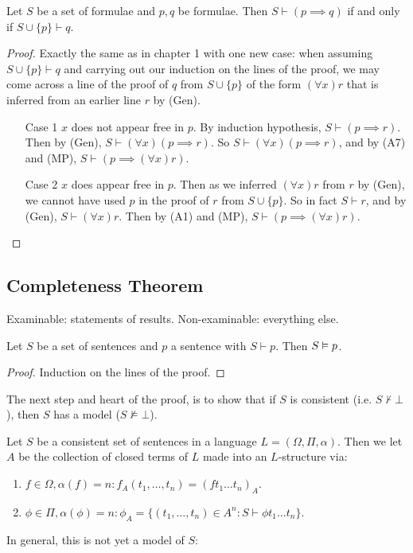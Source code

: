 \documentclass[10pt,a4paper]{article}
\begin{document}
\begin{proposition}
Let $S$ be a set of formulae and $p,q$ be formulae. Then $S \vdash (p \implies q)$ if and only if $S \cup \{p\} \vdash q$.
\end{proposition}
\begin{proof}
Exactly the same as in chapter 1 with one new case: when assuming $S \cup \{p\}\vdash q$ and carrying out our induction on the lines of the proof, we may come across a line of the proof of $q$ from $S \cup \{p\}$ of the form $(\forall x)r$ that is inferred from an earlier line $r$ by (Gen).
\begin{itemize}
\item[Case 1] $x$ does not appear free in $p$. By induction hypothesis, $S \vdash (p \implies r)$. Then by (Gen), $S \vdash (\forall x)(p \implies r)$. So $S \vdash (\forall x)(p \implies r)$, and by (A7) and (MP), $S \vdash (p \implies (\forall x) r)$.
\item[Case 2] $x$ does appear free in $p$. Then as we inferred $(\forall x)r$ from $r$ by (Gen), we cannot have used $p$ in the proof of $r$ from $S \cup \{p\}$. So in fact $S \vdash r$, and by (Gen), $S\vdash (\forall x)r$. Then by (A1) and (MP), $S \vdash (p \implies (\forall x)r)$.
\end{itemize}
\end{proof}
\subsection{Completeness Theorem}
Examinable: statements of results.
Non-examinable: everything else.

\begin{proposition}
Let $S$ be a set of sentences and $p$ a sentence with $S \vdash p$. Then $S \vDash p$.
\end{proposition}
\begin{proof}
Induction on the lines of the proof.
\end{proof}

The next step and heart of the proof, is to show that if $S$ is consistent (i.e. $S \nvdash \bot$), then $S$ has a model ($S\nvDash \bot$).

Let $S$ be a consistent set of sentences in a language $L = (\Omega, \Pi, \alpha)$. Then we let $A$ be the collection of closed terms of $L$ made into an $L$-structure via:
\begin{enumerate}
\item $f \in \Omega, \alpha(f) = n: f_A(t_1, \ldots, t_n)  = (ft_1\ldots t_n)_A$.
\item $\phi \in \Pi, \alpha(\phi) = n: \phi_A = \{(t_1, \ldots, t_n) \in A^n : S \vdash \phi t_1 \ldots t_n\}$.
\end{enumerate}
In general, this is not yet a model of $S$:
\end{document}

